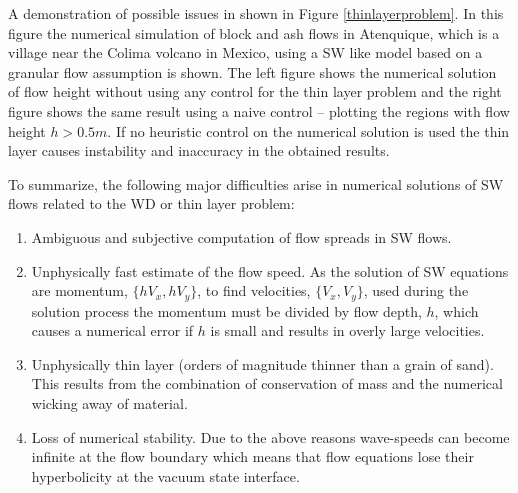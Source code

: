 \documentclass[letterpaper,10pt]{article}
\begin{document}
A demonstration of possible issues in shown in Figure \ref{thinlayerproblem}.
In this figure the numerical simulation of block and ash flows in Atenquique, which is a village near the Colima volcano in Mexico, using a SW like model 
based on a granular flow assumption is shown. The left figure shows the numerical solution of flow height without using any control for the thin layer problem 
and the right figure shows the same result  
using a naive control -- plotting the regions with flow height $h>0.5m$. If no heuristic control on the numerical solution is used the thin layer causes instability and 
inaccuracy in the obtained results.

To summarize, the following major difficulties arise in numerical solutions of SW flows related to the WD or thin layer problem:
\begin{enumerate}
	\item Ambiguous and subjective computation of flow spreads in SW flows.
	\item \label{problemwicking}
	     Unphysically fast estimate of the flow speed. As the solution of SW equations are momentum, $\{hV_x,hV_y\}$, to find velocities, $\{V_x,V_y\}$, used during the solution process the
	     momentum must be divided by flow depth, $h$, which causes a numerical error if $h$ is small and results in overly large velocities.
	\item \label{problemtoothin}
	      Unphysically thin layer (orders of magnitude thinner than a grain of sand). This results from the combination of conservation of mass and the numerical wicking away of material.
	\item \label{problemunstable}
	      Loss of numerical stability. Due to the above reasons wave-speeds can become infinite at the flow boundary which means that flow equations lose their hyperbolicity  
	      at the vacuum state interface.
\end{enumerate}\label{thinprob}
\end{document}
